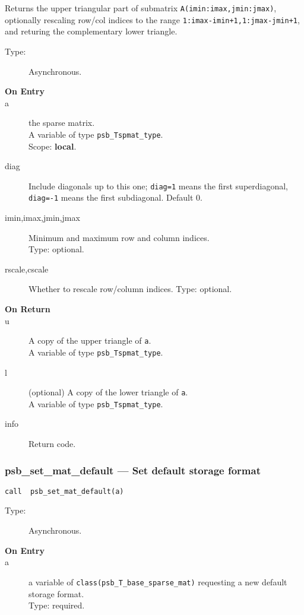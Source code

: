 Returns the upper triangular part of submatrix
\verb|A(imin:imax,jmin:jmax)|, optionally rescaling row/col indices to
the range \verb|1:imax-imin+1,1:jmax-jmin+1|, and returing the
complementary lower triangle. 
\begin{description}
\item[Type:] Asynchronous.
\item[\bf On Entry]
\item[a] the sparse matrix.\\
A variable of type \verb|psb_Tspmat_type|.\\
Scope: {\bf local}.\\
\item[diag] Include diagonals up to this one; \verb|diag=1| means the
  first superdiagonal, \verb|diag=-1| means the first subdiagonal. 
Default 0.
\item[imin,imax,jmin,jmax] Minimum and maximum row and column indices.\\
Type: optional.
\item[rscale,cscale] Whether to rescale row/column indices.
Type: optional.
\end{description}
\begin{description}
\item[\bf On Return]
\item[u]  A copy  of the upper triangle of \verb|a|.\\
A variable of type \verb|psb_Tspmat_type|.
\item[l] (optional) A copy  of the lower triangle of \verb|a|.\\
A variable of type \verb|psb_Tspmat_type|.
\item[info] Return code. 
\end{description}




\subsubsection*{psb\_set\_mat\_default --- Set default  storage format}


\begin{verbatim}
call  psb_set_mat_default(a)
\end{verbatim}

\begin{description}
\item[Type:] Asynchronous.
\item[\bf On Entry]
\item[a] a variable of \verb|class(psb_T_base_sparse_mat)|  requesting
  a new default storage format.\\ 
Type: required.
\end{description}





